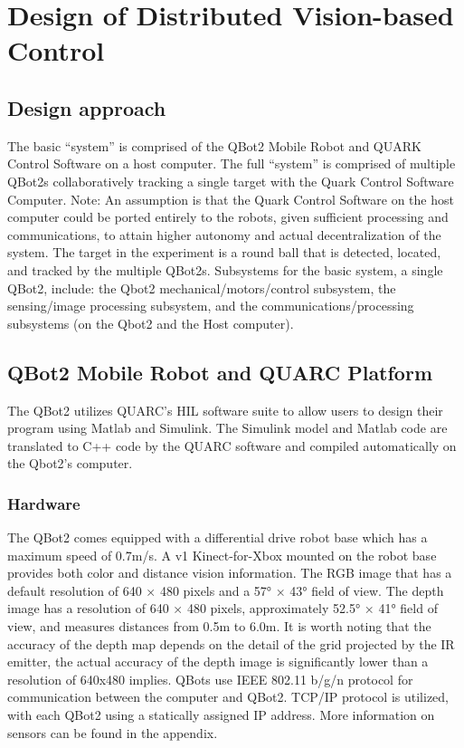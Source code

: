 \chapter{Design of Distributed Vision-based Control}


\section{Design approach}

The basic “system” is comprised of the QBot2 Mobile Robot and QUARK Control Software on a host computer.  The full “system” is comprised of multiple QBot2s collaboratively tracking a single target with the Quark Control Software Computer.  Note: An assumption is that the Quark Control Software on the host computer could be ported entirely to the robots, given sufficient processing and communications, to attain higher autonomy and actual decentralization of the system.  The target in the experiment is a round ball that is detected, located, and tracked by the multiple QBot2s.    
Subsystems for the basic system, a single QBot2, include: the Qbot2 mechanical/motors/control subsystem, the sensing/image processing subsystem, and the communications/processing subsystems (on the Qbot2 and the Host computer). 

\section{QBot2 Mobile Robot and QUARC Platform}

The QBot2 utilizes QUARC’s HIL software suite to allow users to design their program using Matlab and Simulink.  The Simulink model and Matlab code are translated to C++ code by the QUARC software and compiled automatically on the Qbot2’s computer.

\subsection{Hardware}

The QBot2 comes equipped with a differential drive robot base which has a maximum speed of 0.7m/s. A v1 Kinect-for-Xbox mounted on the robot base provides both color and distance vision information.  The RGB image that has a default resolution of 640 × 480 pixels and a 57° × 43° field of view.  The depth image has a resolution of 640 × 480 pixels, approximately 52.5° × 41° field of view, and measures distances from 0.5m to 6.0m. It is worth noting that the accuracy of the depth map depends on the detail of the grid projected by the IR emitter, the actual accuracy of the depth image is significantly lower than a resolution of 640x480 implies.   QBots use IEEE 802.11 b/g/n protocol for communication between the computer and QBot2. TCP/IP protocol is utilized, with each QBot2 using a statically assigned IP address. More information on sensors can be found in the appendix.

